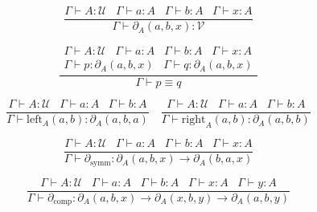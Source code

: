 \documentclass[a4paper,UKenglish,cleveref, autoref, thm-restate]{lipics-v2021}
\newcommand{\UU}{\ensuremath{\mathcal{U}}}
\newcommand{\VV}{\ensuremath{\mathcal{V}}}
\begin{document}
\begin{equation*}
    \frac{\Gamma \vdash A : \UU \hspace{10pt} \Gamma \vdash a : A \hspace{10pt} \Gamma \vdash b : A \hspace{10pt} \Gamma \vdash x : A}
         {\Gamma \vdash \partial_A(a, b, x) : \VV}
\end{equation*}

\begin{equation*}
    \frac{\begin{matrix}
            \Gamma \vdash A : \UU \hspace{10pt} \Gamma \vdash a : A \hspace{10pt} \Gamma \vdash b : A \hspace{10pt} \Gamma \vdash x : A \\
            \Gamma \vdash p : \partial_A(a, b, x) \hspace{10pt} \Gamma \vdash q : \partial_A(a, b, x)
          \end{matrix}}
         {\Gamma \vdash p \equiv q}
\end{equation*}

\begin{equation*}
    \frac{\Gamma \vdash A : \UU \hspace{10pt} \Gamma \vdash a : A \hspace{10pt} \Gamma \vdash b : A}
         {\Gamma \vdash \mathrm{left}_A(a, b) : \partial_A(a, b, a)}
    \quad
    \frac{\Gamma \vdash A : \UU \hspace{10pt} \Gamma \vdash a : A \hspace{10pt} \Gamma \vdash b : A}
         {\Gamma \vdash \mathrm{right}_A(a, b) : \partial_A(a, b, b)}
\end{equation*}

\begin{equation*}
    \frac{\Gamma \vdash A : \UU \hspace{10pt} \Gamma \vdash a : A \hspace{10pt} \Gamma \vdash b : A \hspace{10pt} \Gamma \vdash x : A}
         {\Gamma \vdash \partial_{\mathrm{symm}} : \partial_A(a, b, x) \rightarrow \partial_A(b, a, x)}
\end{equation*}

\begin{equation*}
    \frac{\Gamma \vdash A : \UU \hspace{10pt} \Gamma \vdash a : A \hspace{10pt} \Gamma \vdash b : A \hspace{10pt} \Gamma \vdash x : A \hspace{10pt} \Gamma \vdash y : A}
         {\Gamma \vdash \partial_{\mathrm{comp}} : \partial_A(a, b, x) \rightarrow \partial_A(x, b, y) \rightarrow \partial_A(a, b, y)}
\end{equation*}
\end{document}
